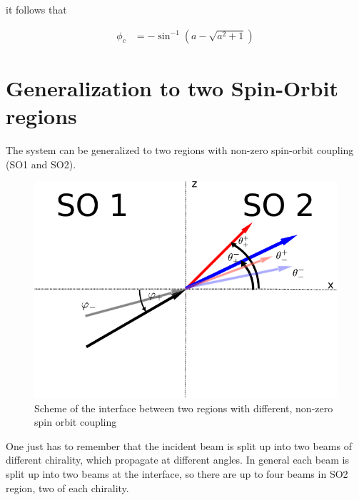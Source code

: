 it follows that

\begin{align}
    \phi_c          &= -\sin ^{-1}\left(a-\sqrt{a^2+1}\right)
\end{align}

\clearpage
\section{Generalization to two Spin-Orbit regions}

The system can be generalized to two regions with non-zero spin-orbit
coupling (SO1 and SO2).

\begin{figure}
    \begin{center}
        \includegraphics{setup-two-so-regions.pdf}
    \end{center}
    \caption{Scheme of the interface between two regions with
        different, non-zero spin orbit coupling}
    \label{fig:setup-nonzero}
\end{figure}

One just has to remember that the incident beam is split up
into two beams of different chirality, which propagate at different
angles. In general each beam is split up into two beams at the
interface, so there are up to four beams in SO2 region, two of each
chirality.

